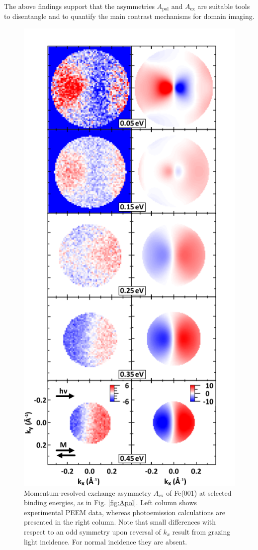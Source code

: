 \documentclass[prl,twocolumn,floatfix]{revtex4-2}
\begin{document}
The above findings support that the asymmetries $A_{\mathrm{pol}}$ and $A_{\mathrm{ex}}$ are suitable tools to disentangle and to quantify the main contrast mechanisms for domain imaging. 
\begin{figure}
    \centering
    \includegraphics[width = 0.7\columnwidth]{FePaperAex.pdf}
    \caption{Momentum-resolved exchange asymmetry $A_{\mathrm{ex}}$ of Fe(001) at selected binding energies, as in Fig. \ref{fig:Apol}. Left column shows experimental PEEM data, whereas photoemission calculations are presented in the right column. Note that small differences with respect to an odd symmetry upon reversal of $k_{x}$ result from grazing light incidence. For normal incidence they are absent.}
    \label{fig:Aex}
\end{figure}
\end{document}
